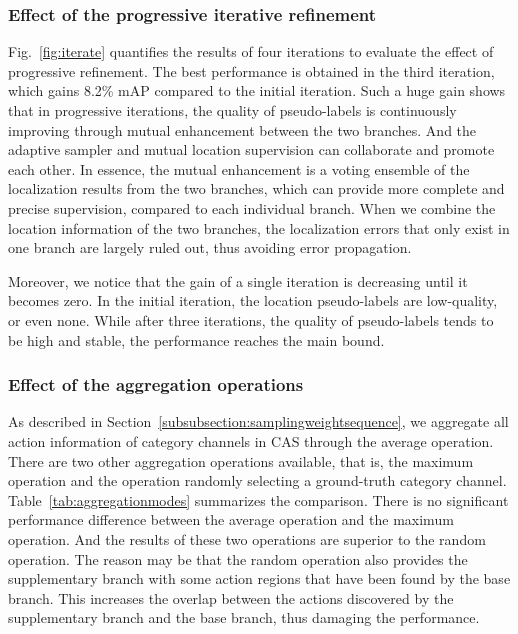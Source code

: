 \documentclass[journal]{IEEEtran}
\begin{document}
\subsubsection{Effect of the progressive iterative refinement}
Fig.~\ref{fig:iterate} quantifies the results of four iterations to evaluate the effect of progressive refinement. The best performance is obtained in the third iteration, which gains 8.2\% mAP compared to the initial iteration. Such a huge gain shows that in progressive iterations, the quality of pseudo-labels is continuously improving through mutual enhancement between the two branches. And the adaptive sampler and mutual location supervision can collaborate and promote each other. In essence, the mutual enhancement is a voting ensemble of the localization results from the two branches, which can provide more complete and precise supervision, compared to each individual branch. When we combine the location information of the two branches, the localization errors that only exist in one branch are largely ruled out, thus avoiding error propagation. 

Moreover, we notice that the gain of a single iteration is decreasing until it becomes zero. In the initial iteration, the location pseudo-labels are low-quality, or even none. While after three iterations, the quality of pseudo-labels tends to be high and stable, the performance reaches the main bound. 


\subsubsection{Effect of the aggregation operations}
As described in Section~\ref{subsubsection:samplingweightsequence}, we aggregate all action information of category channels in CAS through the average operation. There are two other aggregation operations available, that is, the maximum operation and the operation randomly selecting a ground-truth category channel. Table~\ref{tab:aggregationmodes} summarizes the comparison. There is no significant performance difference between the average operation and the maximum operation. And the results of these two operations are superior to the random operation. The reason may be that the random operation also provides the supplementary branch with some action regions that have been found by the base branch. This increases the overlap between the actions discovered by the supplementary branch and the base branch, thus damaging the performance.
\end{document}
